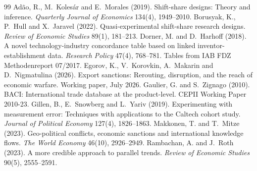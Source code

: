 \documentclass[11pt,a4paper]{article}
\begin{document}
\clearpage
\begin{thebibliography}{99}\small
{}
Ad\~{a}o, R., M.~Koles\'{a}r and E.~Morales (2019). Shift-share designs: Theory and inference. \emph{Quarterly
Journal of Economics} 134(4), 1949--2010.
Borusyak, K., P.~Hull and X.~Jaravel (2022). Quasi-experimental shift-share research designs. \emph{Review of
Economic Studies} 89(1), 181--213.
Dorner, M. and D.~Harhoff (2018). A novel technology-industry concordance table based on linked
inventor-establishment data. \emph{Research Policy} 47(4), 768--781. Tables from IAB FDZ Methodenreport 07/2017.
Egorov, K., V.~Korovkin, A.~Makarin and D.~Nigmatulina (2026). Export sanctions: Rerouting, disruption, and the
reach of economic warfare. Working paper, July 2026.
Gaulier, G. and S.~Zignago (2010). BACI: International trade database at the product-level. CEPII Working Paper
2010-23.
Gillen, B., E.~Snowberg and L.~Yariv (2019). Experimenting with measurement error: Techniques with applications to
the Caltech cohort study. \emph{Journal of Political Economy} 127(4), 1826--1863.
Makkonen, T. and T.~Mitze (2023). Geo-political conflicts, economic sanctions and international knowledge flows.
\emph{The World Economy} 46(10), 2926--2949.
Rambachan, A. and J.~Roth (2023). A more credible approach to parallel trends. \emph{Review of Economic Studies}
90(5), 2555--2591.
\end{thebibliography}
\end{document}
